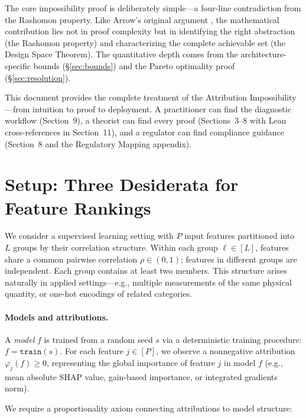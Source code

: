 \documentclass{article}
\begin{document}
The core impossibility proof is deliberately simple---a four-line contradiction from the Rashomon property.
Like Arrow's original argument \citep{arrow1951social}, the mathematical contribution lies not in proof complexity but in identifying the right abstraction (the Rashomon property) and characterizing the complete achievable set (the Design Space Theorem).
The quantitative depth comes from the architecture-specific bounds (\S\ref{sec:bounds}) and the Pareto optimality proof (\S\ref{sec:resolution}).

This document provides the complete treatment of the Attribution Impossibility---from intuition to proof to deployment. A practitioner can find the diagnostic workflow (Section~9), a theorist can find every proof (Sections~3--8 with Lean cross-references in Section~11), and a regulator can find compliance guidance (Section~8 and the Regulatory Mapping appendix).


\section{Setup: Three Desiderata for Feature Rankings}
\label{sec:setup}

We consider a supervised learning setting with $P$ input features partitioned into $L$ groups by their correlation structure.
Within each group $\ell \in [L]$, features share a common pairwise correlation $\rho \in (0,1)$; features in different groups are independent.
Each group contains at least two members.
This structure arises naturally in applied settings---e.g., multiple measurements of the same physical quantity, or one-hot encodings of related categories.

\paragraph{Models and attributions.}
A \emph{model} $f$ is trained from a random seed $s$ via a deterministic training procedure: $f = \texttt{train}(s)$.
For each feature $j \in [P]$, we observe a nonneg\-ative attribution $\varphi_j(f) \geq 0$, representing the global importance of feature $j$ in model $f$ (e.g., mean absolute SHAP value, gain-based importance, or integrated gradients norm).

We require a proportionality axiom connecting attributions to model structure:
\end{document}
